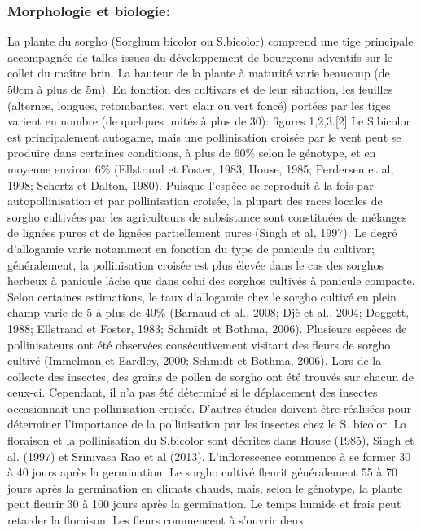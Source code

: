 \documentclass[a4paper,11pt]{article}
\begin{document}
\subsubsection{Morphologie et biologie:} La plante du sorgho
(Sorghum bicolor ou S.bicolor) comprend une tige principale
accompagnée de talles issues du développement de bourgeons
adventifs sur le collet du maître brin. La hauteur de la plante à
maturité varie beaucoup (de 50cm à plus de 5m). En fonction des
cultivars et de leur situation, les feuilles (alternes, longues,
retombantes, vert clair ou vert foncé) portées par les tiges
varient en nombre (de quelques unités à plus de 30): figures
1,2,3.[2] Le S.bicolor est principalement autogame, mais une
pollinisation croisée par le vent peut se produire dans certaines
conditions, à plus de 60\% selon le génotype, et en moyenne
environ 6\% (Ellstrand et Foster, 1983; House, 1985; Perdersen et
al, 1998; Schertz et Dalton, 1980). Puisque l’espèce se reproduit
à la fois par autopollinisation et par pollinisation croisée, la
plupart des races locales de sorgho cultivées par les
agriculteurs de subsistance sont constituées de mélanges de
lignées pures et de lignées partiellement pures (Singh et al,
1997). Le degré d’allogamie varie notamment en fonction du type
de panicule du cultivar; généralement, la pollinisation croisée
est plus élevée dans le cas des sorghos herbeux à panicule lâche
que dans celui des sorghos cultivés à panicule compacte. Selon
certaines estimations, le taux d’allogamie chez le sorgho cultivé
en plein champ varie de 5 à plus de 40\% (Barnaud et al., 2008;
Djè et al., 2004; Doggett, 1988; Ellstrand et Foster, 1983;
Schmidt et Bothma, 2006). Plusieurs espèces de pollinisateurs ont
été observées consécutivement visitant des fleurs de sorgho
cultivé (Immelman et Eardley, 2000; Schmidt et Bothma,
2006). Lors de la collecte des insectes, des grains de pollen de
sorgho ont été trouvés sur chacun de ceux-ci. Cependant, il n’a
pas été déterminé si le déplacement des insectes occasionnait une
pollinisation croisée. D’autres études doivent être réalisées
pour déterminer l’importance de la pollinisation par les insectes
chez le S. bicolor. La floraison et la pollinisation du S.bicolor
sont décrites dans House (1985), Singh et al. (1997) et Srinivasa
Rao et al (2013). L’inflorescence commence à se former 30 à 40
jours après la germination. Le sorgho cultivé fleurit
généralement 55 à 70 jours après la germination en climats
chauds, mais, selon le génotype, la plante peut fleurir 30 à 100
jours après la germination. Le temps humide et frais peut
retarder la floraison. Les fleurs commencent à s’ouvrir deux
\end{document}
